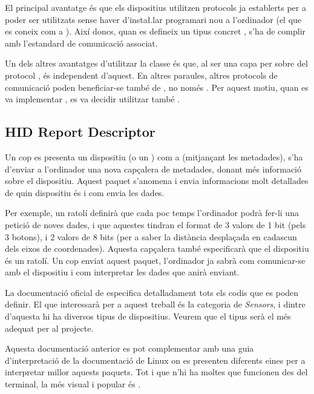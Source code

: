 El principal avantatge és que els dispositius
 utilitzen protocols ja establerts per a poder ser utilitzats
sense haver d'insta\l.lar programari nou a l'ordinador (el que es coneix com
a ). Així doncs, quan es defineix un tipus concret ,
s'ha de complir amb l'estandard de comunicació associat.

Un dels altres avantatges d'utilitzar la classe  és que, al ser una capa per
sobre del protocol , és independent d'aquest. En altres paraules,
altres protocols de comunicació poden beneficiar-se també de , no
només . Per aquest motiu, quan es va implementar ,
es va decidir utilitzar també  \cite{BluetoothHid}.

\subsection{HID Report Descriptor}

Un cop es presenta un dispositiu (o un ) com a 
(mitjançant les metadades), s'ha d'enviar a l'ordinador una nova capçalera de
metadades, donant més informació sobre el dispositiu. Aquest paquet s'anomena
 i envia informacions molt detallades de
quin dispositiu és i com envia les dades.

Per exemple, un ratolí definirà que cada poc temps l'ordinador podrà fer-li
una petició de noves dades, i que aquestes tindran el format de 3 valors
de 1 bit (pels 3 botons), i 2 valors de 8 bits (per a saber la distància
desplaçada en cadascun dels eixos de coordenades). Aquesta capçalera també
especificarà que el dispositiu és un ratolí. Un cop enviat aquest paquet,
l'ordinador ja sabrà com comunicar-se amb el
dispositiu i com interpretar les dades que anirà enviant.

La documentació oficial de  \cite{HidHut} especifica
detalladament tots els codis que es poden definir. El que interessarà per a
aquest treball és la categoria de \emph{Sensors}, i dintre d'aquesta hi ha
diversos tipus de dispositius. Veurem que el tipus  serà
el més adequat per al projecte.

Aquesta documentació anterior es pot complementar amb una guia d'interpretació
de la documentació de Linux \cite{LinuxHid} on es presenten diferents eines
per a interpretar millor aquests paquets. Tot i que n'hi ha moltes que
funcionen des del terminal, la més visual i popular és .

